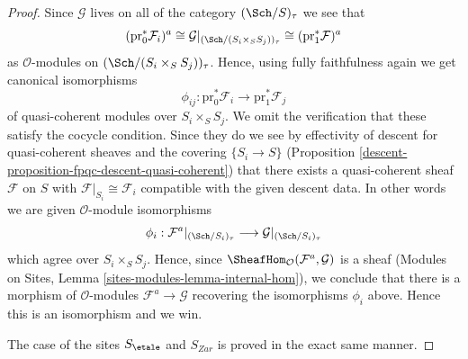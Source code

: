 \begin{proof}
\medskip\noindent
Since $\mathcal{G}$ lives on all of the category
$(\Sch/S)_\tau$ we see that
$$
(\text{pr}_0^*\mathcal{F}_i)^a
\cong
\mathcal{G}|_{(\Sch/(S_i \times_S S_j))_\tau}
\cong
(\text{pr}_1^*\mathcal{F})^a
$$
as $\mathcal{O}$-modules on $(\Sch/(S_i \times_S S_j))_\tau$.
Hence, using fully faithfulness again we get canonical isomorphisms
$$
\phi_{ij} :
\text{pr}_0^*\mathcal{F}_i
\longrightarrow
\text{pr}_1^*\mathcal{F}_j
$$
of quasi-coherent modules over $S_i \times_S S_j$. We omit the verification
that these satisfy the cocycle condition. Since they do we see by
effectivity of descent for quasi-coherent sheaves and the covering
$\{S_i \to S\}$ (Proposition \ref{descent-proposition-fpqc-descent-quasi-coherent})
that there exists a quasi-coherent sheaf $\mathcal{F}$ on $S$
with $\mathcal{F}|_{S_i} \cong \mathcal{F}_i$ compatible
with the given descent data. In other words we are given
$\mathcal{O}$-module isomorphisms
$$
\phi_i :
\mathcal{F}^a|_{(\Sch/S_i)_\tau}
\longrightarrow
\mathcal{G}|_{(\Sch/S_i)_\tau}
$$
which agree over $S_i \times_S S_j$. Hence, since
$\SheafHom_\mathcal{O}(\mathcal{F}^a, \mathcal{G})$ is
a sheaf (Modules on Sites, Lemma \ref{sites-modules-lemma-internal-hom}),
we conclude that
there is a morphism of $\mathcal{O}$-modules $\mathcal{F}^a \to \mathcal{G}$
recovering the isomorphisms $\phi_i$ above. Hence this is an isomorphism
and we win.

\medskip\noindent
The case of the sites $S_\etale$ and $S_{Zar}$ is proved in the
exact same manner.
\end{proof}

